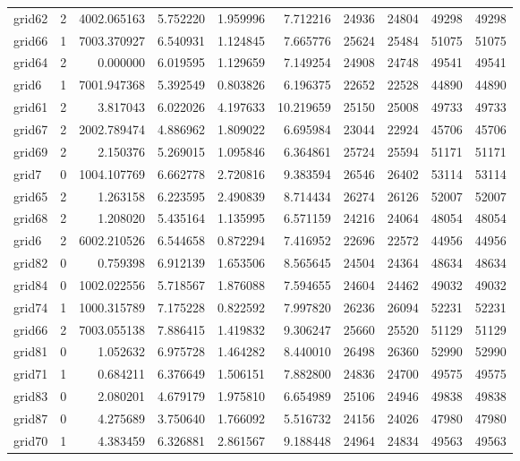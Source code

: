 \begin{longtable}{|l|r|r|r|r|r|r|r|r|r|}
grid62 & 2 & 4002.065163 & 5.752220 & 1.959996 & 7.712216 & 24936 & 24804 & 49298 & 49298 \\
grid66 & 1 & 7003.370927 & 6.540931 & 1.124845 & 7.665776 & 25624 & 25484 & 51075 & 51075 \\
grid64 & 2 & 0.000000 & 6.019595 & 1.129659 & 7.149254 & 24908 & 24748 & 49541 & 49541 \\
grid6 & 1 & 7001.947368 & 5.392549 & 0.803826 & 6.196375 & 22652 & 22528 & 44890 & 44890 \\
grid61 & 2 & 3.817043 & 6.022026 & 4.197633 & 10.219659 & 25150 & 25008 & 49733 & 49733 \\
grid67 & 2 & 2002.789474 & 4.886962 & 1.809022 & 6.695984 & 23044 & 22924 & 45706 & 45706 \\
grid69 & 2 & 2.150376 & 5.269015 & 1.095846 & 6.364861 & 25724 & 25594 & 51171 & 51171 \\
grid7 & 0 & 1004.107769 & 6.662778 & 2.720816 & 9.383594 & 26546 & 26402 & 53114 & 53114 \\
grid65 & 2 & 1.263158 & 6.223595 & 2.490839 & 8.714434 & 26274 & 26126 & 52007 & 52007 \\
grid68 & 2 & 1.208020 & 5.435164 & 1.135995 & 6.571159 & 24216 & 24064 & 48054 & 48054 \\
grid6 & 2 & 6002.210526 & 6.544658 & 0.872294 & 7.416952 & 22696 & 22572 & 44956 & 44956 \\
grid82 & 0 & 0.759398 & 6.912139 & 1.653506 & 8.565645 & 24504 & 24364 & 48634 & 48634 \\
grid84 & 0 & 1002.022556 & 5.718567 & 1.876088 & 7.594655 & 24604 & 24462 & 49032 & 49032 \\
grid74 & 1 & 1000.315789 & 7.175228 & 0.822592 & 7.997820 & 26236 & 26094 & 52231 & 52231 \\
grid66 & 2 & 7003.055138 & 7.886415 & 1.419832 & 9.306247 & 25660 & 25520 & 51129 & 51129 \\
grid81 & 0 & 1.052632 & 6.975728 & 1.464282 & 8.440010 & 26498 & 26360 & 52990 & 52990 \\
grid71 & 1 & 0.684211 & 6.376649 & 1.506151 & 7.882800 & 24836 & 24700 & 49575 & 49575 \\
grid83 & 0 & 2.080201 & 4.679179 & 1.975810 & 6.654989 & 25106 & 24946 & 49838 & 49838 \\
grid87 & 0 & 4.275689 & 3.750640 & 1.766092 & 5.516732 & 24156 & 24026 & 47980 & 47980 \\
grid70 & 1 & 4.383459 & 6.326881 & 2.861567 & 9.188448 & 24964 & 24834 & 49563 & 49563 \\

\end{longtable}
